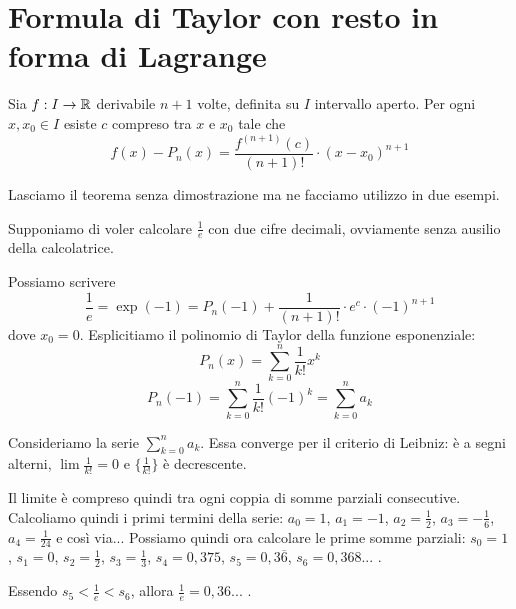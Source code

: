 \section{Formula di Taylor con resto in forma di Lagrange}

\begin{theorem}
Sia $f: I \to \mathbb R$ derivabile $n+1$ volte, definita su $I$ intervallo aperto. Per ogni $x, x_0 \in I$ esiste $c$ compreso tra $x$ e $x_0$ tale che
\begin{equation*}
f(x) - P_n(x) = \frac{f^{(n+1)}(c)}{(n+1)!} \cdot (x-x_0)^{n+1}
\end{equation*}
\end{theorem}

Lasciamo il teorema senza dimostrazione ma ne facciamo utilizzo in due esempi.

\begin{example}
Supponiamo di voler calcolare $\frac{1}{e}$ con due cifre decimali, ovviamente senza ausilio della calcolatrice.

Possiamo scrivere
\begin{equation*}
\frac{1}{e} = \exp(-1) = P_n(-1) + \frac{1}{(n+1)!} \cdot e^c \cdot (-1)^{n+1}
\end{equation*}
dove $x_0 = 0$. Esplicitiamo il polinomio di Taylor della funzione esponenziale:
\begin{equation*}
P_n(x) = \sum_{k=0}^n \frac{1}{k!} x^k 
\end{equation*}
\begin{equation*}
P_n(-1) = \sum_{k=0}^n \frac{1}{k!} (-1)^k = \sum_{k=0}^n a_k
\end{equation*}

Consideriamo la serie $\sum_{k=0}^n a_k$. Essa converge per il criterio di Leibniz: è a segni alterni, $\lim \frac{1}{k!} = 0$ e $\{\frac{1}{k!}\}$ è decrescente.

Il limite è compreso quindi tra ogni coppia di somme parziali consecutive. Calcoliamo quindi i primi termini della serie: $a_0 = 1$, $a_1 = -1$, $a_2 = \frac{1}{2}$, $a_3 = -\frac{1}{6}$, $a_4 = \frac{1}{24}$ e così via...
Possiamo quindi ora calcolare le prime somme parziali: $s_0 = 1$, $s_1 = 0$, $s_2 = \frac{1}{2}$, $s_3 = \frac{1}{3}$, $s_4 = 0,375$, $s_5 = 0,3\overline{6}$, $s_6 = 0,368...$ .

Essendo $s_5 < \frac{1}{e} < s_6$, allora $\frac{1}{e} = 0,36...$ .
\end{example}


